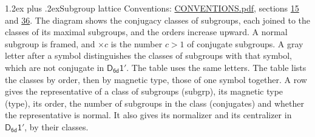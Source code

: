 \documentclass[10pt,a4paper]{article}
\makeatletter
\renewcommand\section{\@startsection{section}{1}{\z@}{-3ex plus -1ex minus -.2ex}%
  {1.2ex plus .2ex}{\normalfont\large\sffamily\bfseries\color{parttitle}}}
\numberwithin{equation}{section}
\newcommand{\grp}[1]{\mathsf{#1}}
\makeatother
\begin{document}
\section{Subgroup lattice}\label{s:subgroups}
Conventions: \href{../../CONVENTIONS.pdf}{CONVENTIONS.pdf}, sections \href{../../../rotation/CONVENTIONS.pdf\#conv.15}{15} and \href{../../CONVENTIONS.pdf\#conv.36}{36}.
The diagram shows the conjugacy classes of subgroups, each joined to the classes of its maximal subgroups, and the orders increase upward. \label{n:index.conjugates.c}\label{n:mark.conjugates}A normal subgroup is framed, and ${\times}c$ is the number $c > 1$ of conjugate subgroups. \label{n:mark.letter}A gray letter after a symbol distinguishes the classes of subgroups with that symbol, which are not conjugate in $\grp{D_{6d}1'}$. The table uses the same letters. The table lists the classes by order, then by magnetic type, those of one symbol together. \label{n:head.subgroup}\label{n:head.magnetic.type}\label{n:head.order}\label{n:head.conjugates}\label{n:head.normal}A row gives the representative of a class of subgroups (subgrp), its magnetic type (type), its order, the number of subgroups in the class (conjugates) and whether the representative is normal. \label{n:head.normalizer}\label{n:head.centralizer}It also gives its normalizer and its centralizer in $\grp{D_{6d}1'}$, by their classes. 
\end{document}
